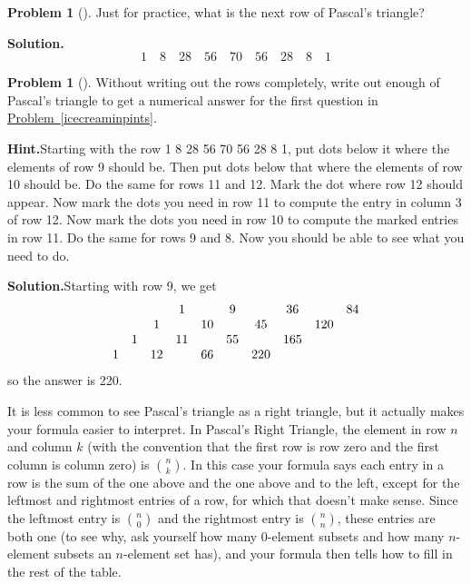 \documentclass[10pt,]{book}
\theoremstyle{plain}
\theoremstyle{definition}
\newtheorem{activity}[project]{Problem}
\theoremstyle{definition}
\numberwithin{equation}{chapter}
\newcommand{\amp}{&}
\begin{document}
%
\begin{activity}[]\label{activity-30}
Just for practice, what is the next row of Pascal's triangle?%
\par\medskip\noindent%
\textbf{Solution.}\quad %
\begin{equation*}
1 \quad 8 \quad 28 \quad 56 \quad 70 \quad 56 \quad 28 \quad 8 \quad 1
\end{equation*}
%
\end{activity}
\begin{activity}[]\label{activity-31}
Without writing out the rows completely, write out enough of Pascal's triangle to get a numerical answer for the first question in \hyperref[icecreaminpints]{Problem~\ref{icecreaminpints}}.%
\par\medskip\noindent%
\textbf{Hint.}\quad Starting with the row 1 8 28 56 70 56 28 8 1, put dots below it where the elements of row 9 should be. Then put dots below that where the elements of row 10 should be. Do the same for rows 11 and 12. Mark the dot where row 12 should appear. Now mark the dots you need in row 11 to compute the entry in column 3 of row 12. Now mark the dots you need in row 10 to compute the marked entries in row 11. Do the same for rows 9 and 8. Now you should be able to see what you need to do.%
\par\medskip\noindent%
\textbf{Solution.}\quad Starting with row 9, we get%
\begin{equation*}
\begin{matrix}\amp \amp \amp 1\amp \amp 9\amp \amp 36\amp \amp 84 \cr\amp \amp 1\amp \amp 10\amp \amp 45\amp \amp 120\cr\amp 1\amp \amp 11\amp \amp 55\amp \amp 165\cr
1\amp \amp 12\amp \amp 66\amp \amp 220
\end{matrix}
\end{equation*}
so the answer is 220.%
\end{activity}
It is less common to see Pascal's triangle as a right triangle, but it actually makes your formula easier to interpret. In Pascal's Right Triangle, the element in row \(n\) and column \(k\) (with the convention that the first row is row zero and the first column is column zero) is \(\binom{n}{k}\). In this case your formula says each entry in a row is the sum of the one above and the one above and to the left, except for the leftmost and rightmost entries of a row, for which that doesn't make sense. Since the leftmost entry is \(\binom{n}{0}\) and the rightmost entry is \(\binom{n}{n}\), these entries are both one (to see why, ask yourself how many \(0\)-element subsets and how many \(n\)-element subsets an \(n\)-element set has), and your formula then tells how to fill in the rest of the table.%
\end{document}
